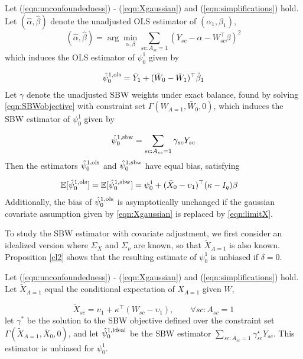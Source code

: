 \begin{proposition}\label{cl1}
Let (\ref{eqn:unconfoundedness}) - (\ref{eqn:Xgaussian}) and (\ref{eqn:simplifications}) hold.
Let $(\hat{\alpha}, \hat{\beta})$ denote the unadjusted OLS estimator of $(\alpha_1, \beta_1)$, 
\begin{equation}\label{eqn:prop1.beta}
(\hat{\alpha}, \hat{\beta}) = \arg \min_{\alpha, \beta} \sum_{sc:A_{sc}=1} (Y_{sc} - \alpha -  W_{sc}^\top \beta)^2
\end{equation}
which induces the OLS estimator of $\psi_0^1$ given by

\begin{align*}
\hat{\psi}^{1,\textup{ols}}_0 = \bar{Y}_1 + (\bar{W}_0 - \bar{W}_1)^\top\hat{\beta}_1
\end{align*}
%
Let ${\gamma}$ denote the unadjusted SBW weights under exact balance, found by solving \eqref{eqn:SBWobjective} with constraint set $\Gamma( W_{A=1}, \bar{W}_0, 0)$, which induces the SBW estimator of $\psi_0^1$ given by

\begin{align*}
\hat{\psi}^{1,\textup{sbw}}_0 = \sum_{sc: A_{sc} = 1} {\gamma}_{sc} Y_{sc}
\end{align*}
%
Then the estimators $\hat{\psi}^{1, \textup{ols}}_0$ and $\hat{\psi}^{1, \textup{sbw}}_0$ have equal bias, satisfying

\begin{align*}
\mathbb{E}[\hat{\psi}_0^{1,\textup{ols}}] &= \mathbb{E}[\hat{\psi}^{1, \textup{sbw}}_0]  = \psi_0^1 + (\bar{X}_0 - \upsilon_1)^\top(\mathbf{\kappa} - I_q)\beta
\end{align*}
Additionally, the bias of $\hat{\psi}_0^{1,\textup{ols}}$ is asymptotically unchanged if the gaussian covariate assumption given by \eqref{eqn:Xgaussian} is replaced by \eqref{eqn:limitX}.
\end{proposition}

To study the SBW estimator with covariate adjustment, we first consider an idealized version where $\Sigma_X$ and $\Sigma_\nu$ are known, so that $\tilde{X}_{A=1}$ is also known. Proposition \ref{cl2} shows that the resulting estimate of $\psi_0^1$ is unbiased if $\delta = 0$.

\begin{proposition}\label{cl2}
Let (\ref{eqn:unconfoundedness}) - (\ref{eqn:Xgaussian}) and (\ref{eqn:simplifications}) hold. Let $\tilde{X}_{A=1}$ equal the conditional expectation of $X_{A=1}$ given $W$,

\[ \tilde{X}_{sc} = \upsilon_1 + \kappa^\top (W_{sc} - \upsilon_1), \qquad \forall sc: A_{sc} = 1\] let $\gamma^*$ be the solution to the SBW objective defined over the constraint set $\Gamma(\tilde{X}_{A=1}, \bar{X}_0, 0)$, and let $\hat{\psi}^{1, \textup{ideal}}_0$ be the SBW estimator $\sum_{sc: A_{sc} = 1}\gamma^\star_{sc}Y_{sc}$. This estimator is unbiased for $\psi_0^1$.
\end{proposition}

